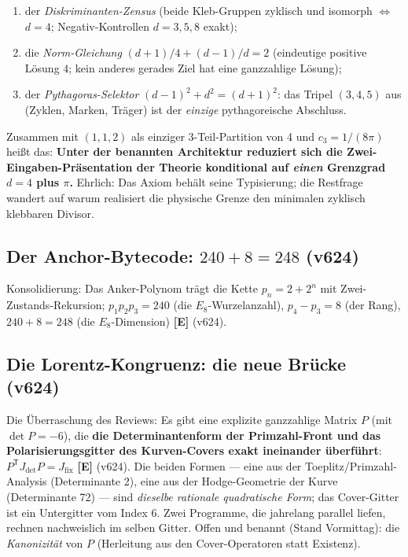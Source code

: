 \documentclass[11pt,a4paper]{article}
\newcommand{\E}{\textcolor{gut}{\textbf{[E]}}}
\begin{document}
\begin{enumerate}
\item der \emph{Diskriminanten-Zensus} (beide Kleb-Gruppen zyklisch
      und isomorph $\Leftrightarrow$ $d = 4$; Negativ-Kontrollen
      $d = 3, 5, 8$ exakt);
\item die \emph{Norm-Gleichung} $(d+1)/4 + (d-1)/d = 2$ (eindeutige
      positive Lösung $4$; kein anderes gerades Ziel hat eine
      ganzzahlige Lösung);
\item der \emph{Pythagoras-Selektor} $(d-1)^2 + d^2 = (d+1)^2$: das
      Tripel $(3, 4, 5)$ aus (Zyklen, Marken, Träger) ist der
      \emph{einzige} pythagoreische Abschluss.
\end{enumerate}

Zusammen mit $(1,1,2)$ als einziger 3-Teil-Partition von 4 und
$c_3 = 1/(8\pi)$ heißt das: \textbf{Unter der benannten Architektur
reduziert sich die Zwei-Eingaben-Präsentation der Theorie konditional
auf \emph{einen} Grenzgrad $d = 4$ plus $\pi$.} Ehrlich: Das Axiom
behält seine Typisierung; die Restfrage wandert auf \glqq{}warum
realisiert die physische Grenze den minimalen zyklisch klebbaren
Divisor\grqq{}.

\subsection*{Der Anchor-Bytecode: $240 + 8 = 248$ (v624)}

Konsolidierung: Das Anker-Polynom trägt die Kette $p_n = 2 + 2^n$ mit
Zwei-Zustands-Rekursion; $p_1 p_2 p_3 = 240$ (die
$E_8$-Wurzelanzahl), $p_4 - p_3 = 8$ (der Rang), $240 + 8 = 248$ (die
$E_8$-Dimension) \E{} (v624).

\subsection*{Die Lorentz-Kongruenz: die neue Brücke (v624)}

Die Überraschung des Reviews: Es gibt eine explizite ganzzahlige
Matrix $P$ (mit $\det P = -6$), die \textbf{die Determinantenform der
Primzahl-Front und das Polarisierungsgitter des Kurven-Covers exakt
ineinander überführt}: $P^{\mathsf T} J_{\det} P = J_{\mathrm{fix}}$
\E{} (v624). Die beiden Formen --- eine aus der Toeplitz/Primzahl-Analysis
(Determinante 2), eine aus der Hodge-Geometrie der Kurve (Determinante
72) --- sind \emph{dieselbe rationale quadratische Form}; das
Cover-Gitter ist ein Untergitter vom Index 6. Zwei Programme, die
jahrelang parallel liefen, rechnen nachweislich im selben Gitter.
Offen und benannt (Stand Vormittag): die \emph{Kanonizität} von $P$
(Herleitung aus den Cover-Operatoren statt Existenz).
\end{document}
